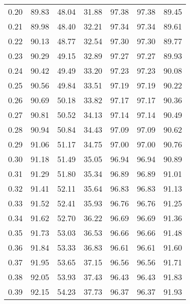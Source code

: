 \begin{tabular}{|c|c|c|c|c|c|c|}
      0.20 &     89.83 &     48.04 &      31.88 &   97.38 &      97.38 &         89.45 \\
      0.21 &     89.98 &     48.40 &      32.21 &   97.34 &      97.34 &         89.61 \\
      0.22 &     90.13 &     48.77 &      32.54 &   97.30 &      97.30 &         89.77 \\
      0.23 &     90.29 &     49.15 &      32.89 &   97.27 &      97.27 &         89.93 \\
      0.24 &     90.42 &     49.49 &      33.20 &   97.23 &      97.23 &         90.08 \\
      0.25 &     90.56 &     49.84 &      33.51 &   97.19 &      97.19 &         90.22 \\
      0.26 &     90.69 &     50.18 &      33.82 &   97.17 &      97.17 &         90.36 \\
      0.27 &     90.81 &     50.52 &      34.13 &   97.14 &      97.14 &         90.49 \\
      0.28 &     90.94 &     50.84 &      34.43 &   97.09 &      97.09 &         90.62 \\
      0.29 &     91.06 &     51.17 &      34.75 &   97.00 &      97.00 &         90.76 \\
      0.30 &     91.18 &     51.49 &      35.05 &   96.94 &      96.94 &         90.89 \\
      0.31 &     91.29 &     51.80 &      35.34 &   96.89 &      96.89 &         91.01 \\
      0.32 &     91.41 &     52.11 &      35.64 &   96.83 &      96.83 &         91.13 \\
      0.33 &     91.52 &     52.41 &      35.93 &   96.76 &      96.76 &         91.25 \\
      0.34 &     91.62 &     52.70 &      36.22 &   96.69 &      96.69 &         91.36 \\
      0.35 &     91.73 &     53.03 &      36.53 &   96.66 &      96.66 &         91.48 \\
      0.36 &     91.84 &     53.33 &      36.83 &   96.61 &      96.61 &         91.60 \\
      0.37 &     91.95 &     53.65 &      37.15 &   96.56 &      96.56 &         91.71 \\
      0.38 &     92.05 &     53.93 &      37.43 &   96.43 &      96.43 &         91.83 \\
      0.39 &     92.15 &     54.23 &      37.73 &   96.37 &      96.37 &         91.93 \\

\end{tabular}
